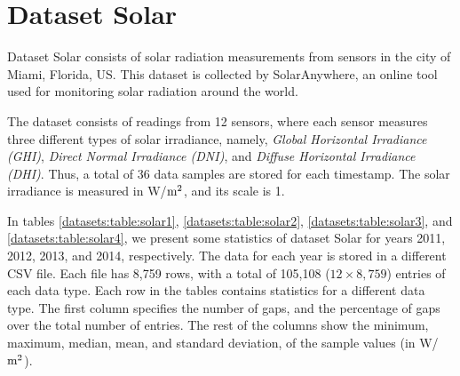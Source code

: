 
\section{Dataset Solar}
\label{datasets:solar}
\newcommand{\unitSolar}{W/$\textnormal{m}^2$}

\vspace{-10pt}
Dataset Solar \cite{dataset:solar} consists of solar radiation measurements from sensors in the city of Miami, Florida, US. This dataset is collected by SolarAnywhere, an online tool used for monitoring solar radiation around the world.


The dataset consists of readings from 12 sensors, where each sensor measures three different types of solar irradiance, namely, \textit{Global Horizontal Irradiance (GHI)}, \textit{Direct Normal Irradiance (DNI)}, and \textit{Diffuse Horizontal Irradiance (DHI)}. Thus, a total of 36 data samples are stored for each timestamp. The solar irradiance is measured in \unitSolar, and its scale is 1.


In tables \ref{datasets:table:solar1}, \ref{datasets:table:solar2}, \ref{datasets:table:solar3}, and \ref{datasets:table:solar4}, we present some statistics of dataset Solar for years 2011, 2012, 2013, and 2014, respectively. The data for each year is stored in a different CSV file. Each file has 8,759 rows, with a total of 105,108 ($12\times8,759$) entries of each data type. Each row in the tables contains statistics for a different data type. The first column specifies the number of gaps, and the percentage of gaps over the total number of entries. The rest of the columns show the minimum, maximum, median, mean, and standard deviation, of the sample values (in \unitSolar).





\clearpage